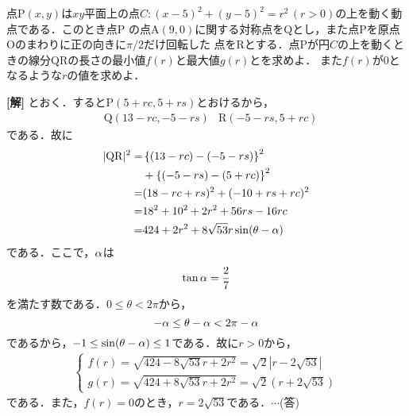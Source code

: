 \documentclass[a4j]{jarticle}
\begin{document}

     \begin{oframed}
     点P$(x,y)$は$xy$平面上の点$C:(x-5)^2+(y-5)^2=r^2\, (r>0)$の上を動く動点である．このとき点P
     の点A$(9,0)$に関する対称点をQとし，また点Pを原点Oのまわりに正の向きに$\pi/2$だけ回転した
     点をRとする．点Pが円$C$の上を動くときの線分QRの長さの最小値$f(r)$と最大値$g(r)$とを求めよ．
     また$f(r)$が$0$となるような$r$の値を求めよ．
     \end{oframed}

\setlength{\columnseprule}{0.4pt}
\begin{multicols}{2}
{\bf[解]} \1 とおく．するとP$(5+rc,5+rs)$とおけるから，
     \begin{align*}
     &\mathrm{Q}(13-rc,-5-rs)&\mathrm{R}(-5-rs,5+rc)
     \end{align*}
である．故に
     \begin{align*}
     |\mathrm{QR}|^2=&\left\{(13-rc)-(-5-rs)\right\}^2 \\
     &+\left\{(-5-rs)-(5+rc)\right\}^2 \\
     =&(18-rc+rs)^2+(-10+rs+rc)^2 \\
     =&18^2+10^2+2r^2+56rs-16rc \\
     =&424+2r^2+8\sqrt{53}r\sin (\theta-\alpha)
     \end{align*}     
である．ここで，$\alpha$は
     \[\tan\alpha=\frac{2}{7}\]
を満たす数である．$0\le \theta <2\pi$から，
     \[-\alpha\le\theta-\alpha <2\pi -\alpha\]
であるから，$-1\le\sin (\theta-\alpha)\le 1$である．故に$r>0$から，
     \begin{align*}
          \begin{cases}
          f(r)=\sqrt{424-8\sqrt{53}r+2r^2}=\sqrt{2}|r-2\sqrt{53}| \\
          g(r)=\sqrt{424+8\sqrt{53}r+2r^2}=\sqrt{2}(r+2\sqrt{53})
          \end{cases}
     \end{align*}
である．また，$f(r)=0$のとき，$r=2\sqrt{53}$である．$\cdots$(答)
\newpage
\end{multicols}
\end{document}
